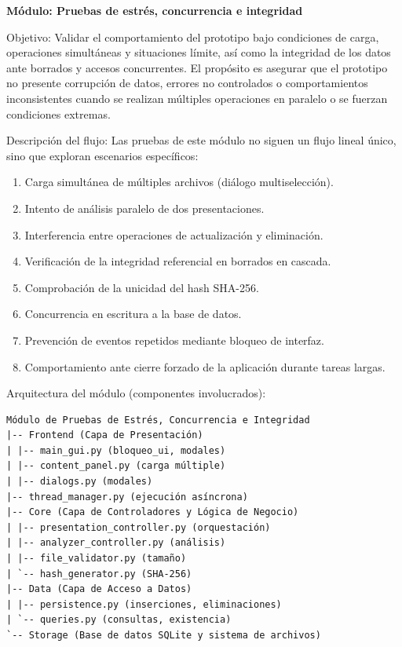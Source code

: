 \documentclass[11pt]{article}
\begin{document}
\textbf{Módulo: Pruebas de estrés, concurrencia e integridad}

Objetivo: Validar el comportamiento del prototipo bajo condiciones de carga, operaciones simultáneas y situaciones límite, así como la integridad de los datos ante borrados y accesos concurrentes. El propósito es asegurar que el prototipo no presente corrupción de datos, errores no controlados o comportamientos inconsistentes cuando se realizan múltiples operaciones en paralelo o se fuerzan condiciones extremas.

Descripción del flujo:
Las pruebas de este módulo no siguen un flujo lineal único, sino que exploran escenarios específicos:

\begin{enumerate}
\item Carga simultánea de múltiples archivos (diálogo multiselección).
\item Intento de análisis paralelo de dos presentaciones.
\item Interferencia entre operaciones de actualización y eliminación.
\item Verificación de la integridad referencial en borrados en cascada.
\item Comprobación de la unicidad del hash SHA-256.
\item Concurrencia en escritura a la base de datos.
\item Prevención de eventos repetidos mediante bloqueo de interfaz.
\item Comportamiento ante cierre forzado de la aplicación durante tareas largas.
\end{enumerate}

Arquitectura del módulo (componentes involucrados):

\begin{verbatim}
Módulo de Pruebas de Estrés, Concurrencia e Integridad
|-- Frontend (Capa de Presentación)
| |-- main_gui.py (bloqueo_ui, modales)
| |-- content_panel.py (carga múltiple)
| |-- dialogs.py (modales)
|-- thread_manager.py (ejecución asíncrona)
|-- Core (Capa de Controladores y Lógica de Negocio)
| |-- presentation_controller.py (orquestación)
| |-- analyzer_controller.py (análisis)
| |-- file_validator.py (tamaño)
| `-- hash_generator.py (SHA-256)
|-- Data (Capa de Acceso a Datos)
| |-- persistence.py (inserciones, eliminaciones)
| `-- queries.py (consultas, existencia)
`-- Storage (Base de datos SQLite y sistema de archivos)
\end{verbatim}
\end{document}
